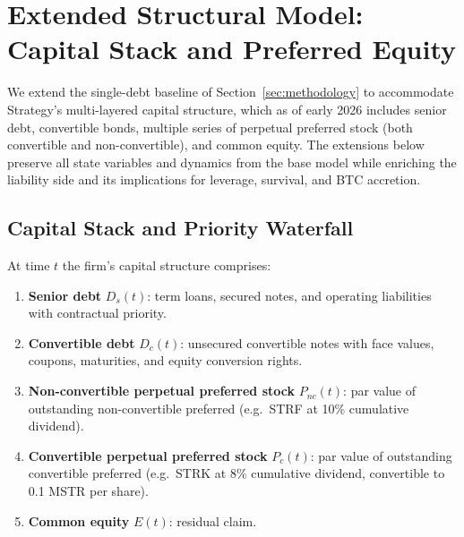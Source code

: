%

\section{Extended Structural Model: Capital Stack and Preferred Equity}\label{sec:model_extended}

We extend the single-debt baseline of Section~\ref{sec:methodology} to accommodate Strategy's
multi-layered capital structure, which as of early 2026 includes senior debt,
convertible bonds, multiple series of perpetual preferred stock (both
convertible and non-convertible), and common equity.  The extensions below
preserve all state variables and dynamics from the base model while enriching
the liability side and its implications for leverage, survival, and BTC
accretion.

\subsection{Capital Stack and Priority Waterfall}\label{subsec:waterfall}

\begin{definition}\label{def:capital_stack}
At time $t$ the firm's capital structure comprises:
\begin{enumerate}
  \item \textbf{Senior debt} $D_s(t)$: term loans, secured notes, and
        operating liabilities with contractual priority.
  \item \textbf{Convertible debt} $D_c(t)$: unsecured convertible notes
        with face values, coupons, maturities, and equity conversion rights.
  \item \textbf{Non-convertible perpetual preferred stock} $P_{nc}(t)$:
        par value of outstanding non-convertible preferred (e.g.\ STRF at
        10\% cumulative dividend).
  \item \textbf{Convertible perpetual preferred stock} $P_c(t)$: par value
        of outstanding convertible preferred (e.g.\ STRK at 8\% cumulative
        dividend, convertible to 0.1 MSTR per share).
  \item \textbf{Common equity} $E(t)$: residual claim.
\end{enumerate}
\end{definition}

